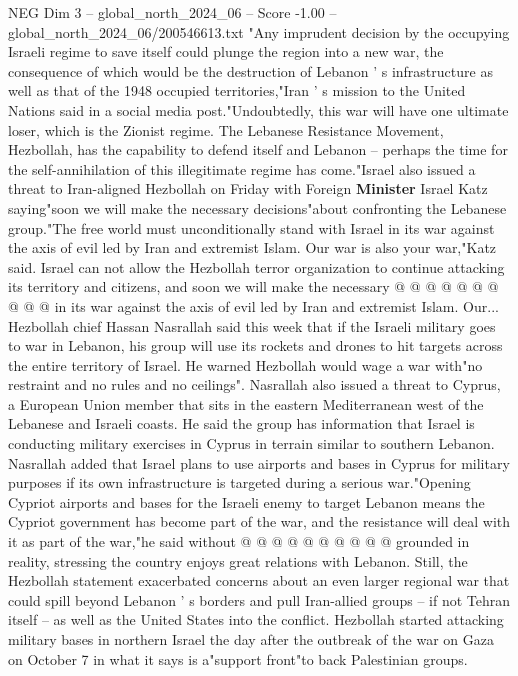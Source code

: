 \begin{textsample}{NEG Dim 3 – global\_north\_2024\_06 – Score -1.00 – global\_north\_2024\_06/200546613.txt}  \label{ex:f3_neg_390}
"Any imprudent decision by the occupying Israeli regime to save itself could plunge the region into a new war, the consequence of which would be the destruction of Lebanon ' s infrastructure as well as that of the 1948 occupied territories,"Iran ' s mission to the United Nations said in a social media post."Undoubtedly, this war will have one ultimate loser, which is the Zionist regime.
The Lebanese Resistance Movement, Hezbollah, has the capability to defend itself and Lebanon -- perhaps the time for the self-annihilation of this illegitimate regime has come."Israel also issued a threat to Iran-aligned Hezbollah on Friday with Foreign \textbf{Minister} Israel Katz saying"soon we will make the necessary decisions"about confronting the Lebanese group."The free world must unconditionally stand with Israel in its war against the axis of evil led by Iran and extremist Islam.
Our war is also your war,"Katz said.
Israel can not allow the Hezbollah terror organization to continue attacking its territory and citizens, and soon we will make the necessary @ @ @ @ @ @ @ @ @ @ in its war against the axis of evil led by Iran and extremist Islam.
Our...
Hezbollah chief Hassan Nasrallah said this week that if the Israeli military goes to war in Lebanon, his group will use its rockets and drones to hit targets across the entire territory of Israel.
He warned Hezbollah would wage a war with"no restraint and no rules and no ceilings".
Nasrallah also issued a threat to Cyprus, a European Union member that sits in the eastern Mediterranean west of the Lebanese and Israeli coasts.
He said the group has information that Israel is conducting military exercises in Cyprus in terrain similar to southern Lebanon.
Nasrallah added that Israel plans to use airports and bases in Cyprus for military purposes if its own infrastructure is targeted during a serious war."Opening Cypriot airports and bases for the Israeli enemy to target Lebanon means the Cypriot government has become part of the war, and the resistance will deal with it as part of the war,"he said without @ @ @ @ @ @ @ @ @ @ grounded in reality, stressing the country enjoys great relations with Lebanon.
Still, the Hezbollah statement exacerbated concerns about an even larger regional war that could spill beyond Lebanon ' s borders and pull Iran-allied groups -- if not Tehran itself -- as well as the United States into the conflict.
Hezbollah started attacking military bases in northern Israel the day after the outbreak of the war on Gaza on October 7 in what it says is a"support front"to back Palestinian groups.

\end{textsample}
